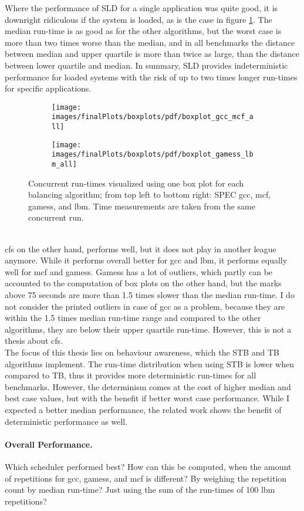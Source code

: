 Where the performance of SLD for a single application was quite good, it is
downright ridiculous if the system is loaded, as is the case in figure
\ref{eval:fig:box_all}.
The median run-time is as good as for the other algorithms, but the worst case
is more than two times worse than the median, and in all benchmarks the
distance between median and upper quartile is more than twice as large, than the distance
between lower quartile and median.
In summary, SLD provides indeterministic performance for loaded systems with
the risk of up to two times longer run-times for specific applications.
%
\begin{figure}[h!]
  \begin{subfigure}{\textwidth}
  \texttt{[image: images/finalPlots/boxplots/pdf/boxplot\_gcc\_mcf\_all]}
  \end{subfigure}
  \begin{subfigure}{\textwidth}
  \texttt{[image: images/finalPlots/boxplots/pdf/boxplot\_gamess\_lbm\_all]}
  \end{subfigure}
  \caption{Concurrent run-times visualized using one box plot for each balancing
    algorithm; from top left to bottom right: SPEC gcc, mcf, gamess, and lbm.
    Time measurements are taken from the same concurrent run.}
    \label{eval:fig:box_all}
\end{figure}
\\
%
\Gls{cfs} on the other hand, performs well, but it does not play in another
league anymore.
While it performs overall better for gcc and lbm, it performs equally well for
mcf and gamess.
Gamess has a lot of outliers, which partly can be accounted to the computation
of box plots on the other hand, but the marks above 75 seconds are more than
1.5 times slower than the median run-time.
I do not consider the printed outliers in case of gcc as a problem, because
they are within the 1.5 times median run-time range and compared to the other
algorithms, they are below their upper quartile run-time.
However, this is not a thesis about \gls{cfs}.
\\

The focus of this thesis lies on behaviour awareness, which the STB and TB
algorithms implement.
The run-time distribution when using STB is lower when compared to TB, thus it
provides more deterministic run-times for all benchmarks.
However, the determinism comes at the cost of higher median and best case
values, but with the benefit if better worst case performance.
While I expected a better median performance, the related work shows the
benefit of deterministic performance as well.


\paragraph{Overall Performance.}
Which scheduler performed best?
How can this be computed, when the amount of repetitions for gcc, gamess, and
mcf is different?
By weighing the repetition count by  median run-time?
Just using the sum of the run-times of 100 lbm repetitions?

